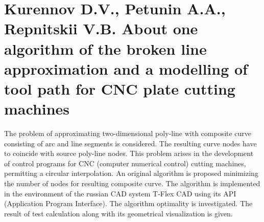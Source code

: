 \section*{Kurennov D.V., Petunin A.A., Repnitskii V.B.
About one algorithm of the broken line approximation and a modelling of tool path
for CNC plate cutting machines}

The problem of approximating two-dimensional poly-line
with composite curve consisting of arc and line segments
is considered.
The resulting curve nodes have to coincide with source poly-line nodes.
This problem arises in the development of control programs
for CNC (computer numerical control) cutting machines,
permitting a circular interpolation.
An original algorithm is proposed
minimizing the number of nodes for resulting composite curve.
The algorithm is implemented in the environment of the russian CAD system 
T-Flex CAD using its API (Application Program Interface).
The algorithm optimality is investigated.
The result of test calculation along with its geometrical visualization is given.
